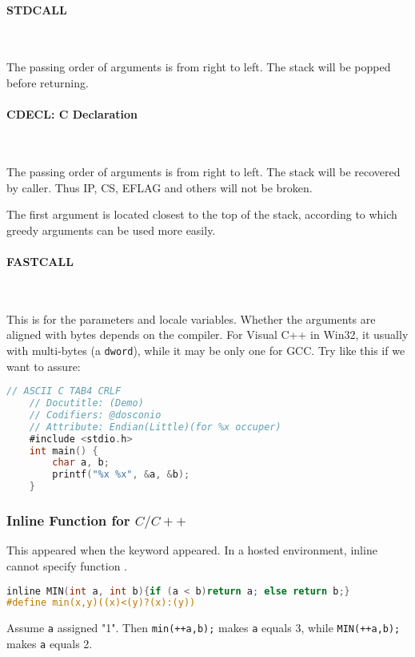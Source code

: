 \paragraph{STDCALL} \

The passing order of arguments is from right to left. The stack will be popped before returning.

\paragraph{CDECL: C Declaration} \

The passing order of arguments is from right to left. The stack will be recovered by caller. Thus {IP}, {CS}, {EFLAG} and others will not be broken.

The first argument is located closest to the top of the stack, according to which greedy arguments can be used more easily.

\paragraph{FASTCALL} \





This is for the parameters and locale variables. Whether the arguments are aligned with bytes depends on the compiler. For Visual C++ in Win32, it usually with multi-bytes (a \verb`dword`), while it may be  only one for GCC. Try like this if we want to assure:

\lstset{style=GlobalC}
\begin{lstlisting}[language=C]
	// ASCII C TAB4 CRLF
	// Docutitle: (Demo) 
	// Codifiers: @dosconio
	// Attribute: Endian(Little)(for %x occuper)
	#include <stdio.h>
	int main() {
		char a, b;
		printf("%x %x", &a, &b);
	}
\end{lstlisting}

\subsubsection{Inline Function for $C/C++$}

This appeared when the keyword  appeared.
In a hosted environment, inline cannot specify function .

\lstset{style=GlobalC}
\begin{lstlisting}[language=C]
inline MIN(int a, int b){if (a < b)return a; else return b;}
#define min(x,y)((x)<(y)?(x):(y))
\end{lstlisting}
Assume \verb|a| assigned "1". Then
\verb`min(++a,b);` makes \verb|a| equals 3, while
\verb`MIN(++a,b);` makes \verb|a| equals 2.

